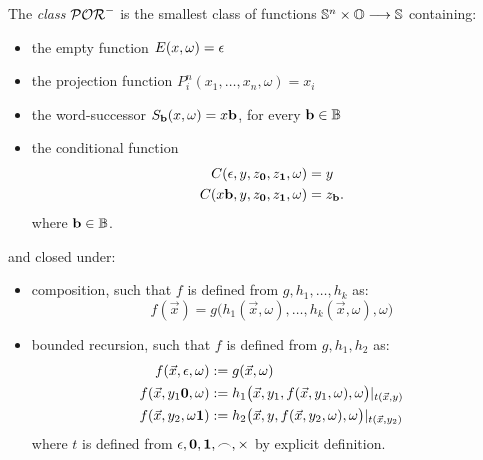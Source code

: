 \begin{defn}
The \emph{class $\mathcal{POR}^-$}
is the smallest class of functions
$\mathbb{S}^n\times \mathbb{O}\longrightarrow \mathbb{S}$ containing:
\begin{itemize}
\itemsep0em

\item the empty function $E(x,\omega)=\epsilon$

\item the projection function
$P^{n}_i(x_1,\dots, x_n,\omega)=x_i$

\item the word-successor $S_{\mathbf{b}}(x,\omega) = x\mathbf{b}$,
for every $\mathbf{b} \in \mathbb{B}$

\item the conditional function
\begin{align*}
C(\epsilon, y, z_{\mathbf{0}}, z_{\mathbf{1}},\omega) &= y \\
C(x\mathbf{b}, y, z_{\mathbf{0}}, z_{\mathbf{1}},\omega) &= z_{\mathbf{b}}.
\end{align*}
where $\mathbf{b} \in \mathbb{B}$.




\end{itemize}
and closed under:
\begin{itemize}
\item composition, such that $f$ is defined from
$g,h_1,\dots, h_k$ as:
$$
f(\vec{x}) = g\big(
h_1(\vec{x},\omega), \dots, h_k(\vec{x},\omega),\omega\big)
$$


\item bounded recursion, such that $f$ is defined from
$g, h_1, h_2$ as:
\begin{align*}
f(\vec{x},\eepsilon,\omega) &:= g(\vec{x},\omega) \\
%
f(\vec{x}, y_1\zero,\omega) &:= h_1
\big(\vec{x}, y_1,
 f(\vec{x},y_1,\omega),\omega\big)|_{t(\vec{x},y)} \\
%
f(\vec{x}, y_2,\omega\one) &:=
h_2\big(\vec{x}, y,
f(\vec{x}, y_2,\omega),\omega\big)|_{t(\vec{x},y_2)}
\end{align*}
where $t$ is defined from $\epsilon, \mathbf{0}, \mathbf{1},
\frown, \times$ by explicit definition.
\end{itemize}
\end{defn}


